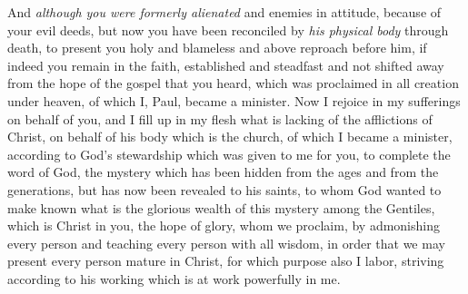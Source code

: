 \begin{biblechapter}
\verse And \textit{although you were formerly alienated} and enemies in attitude, because of your evil deeds,
\verse but now you have been reconciled by \textit{his physical body} through death, to present you holy and blameless and above reproach before him,
\verse if indeed you remain in the faith, established and steadfast and not shifted away from the hope of the gospel that you heard, which was proclaimed in all creation under heaven, of which I, Paul, became a minister.
 Now I rejoice in my sufferings on behalf of you, and I fill up in my flesh what is lacking of the afflictions of Christ, on behalf of his body which is the church,
\verse of which I became a minister, according to God’s stewardship which was given to me for you, to complete the word of God,
\verse the mystery which has been hidden from the ages and from the generations, but has now been revealed to his saints,
\verse to whom God wanted to make known what is the glorious wealth of this mystery among the Gentiles, which is Christ in you, the hope of glory,
\verse whom we proclaim, by admonishing every person and teaching every person with all wisdom, in order that we may present every person mature in Christ,
\verse for which purpose also I labor, striving according to his working which is at work powerfully in me.
\end{biblechapter}

